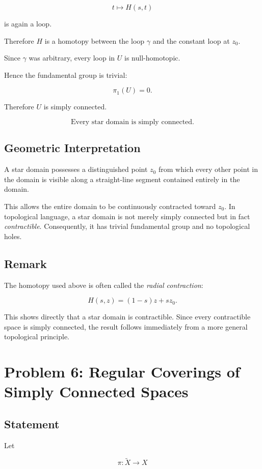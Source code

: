 \documentclass[12pt,a4paper]{article}
\theoremstyle{notespace}
\begin{document}
\[
t\mapsto H(s,t)
\]

is again a loop.

Therefore \(H\) is a homotopy between the loop \(\gamma\) and the constant loop at \(z_0\).

Since \(\gamma\) was arbitrary, every loop in \(U\) is null-homotopic.

Hence the fundamental group is trivial:

\[
\pi_1(U)=0.
\]

Therefore \(U\) is simply connected.

\[
\boxed{\text{Every star domain is simply connected.}}
\]

\subsection{Geometric Interpretation}

A star domain possesses a distinguished point \(z_0\) from which every other point in the domain is visible along a straight-line segment contained entirely in the domain.

This allows the entire domain to be continuously contracted toward \(z_0\). In topological language, a star domain is not merely simply connected but in fact \emph{contractible}. Consequently, it has trivial fundamental group and no topological holes.

\subsection{Remark}

The homotopy used above is often called the \emph{radial contraction}:

\[
H(s,z)
=
(1-s)z+sz_0.
\]

This shows directly that a star domain is contractible. Since every contractible space is simply connected, the result follows immediately from a more general topological principle.

\section{Problem 6: Regular Coverings of Simply Connected Spaces}

\subsection{Statement}

Let

\[
\pi:\widetilde X\to X
\]
\end{document}
